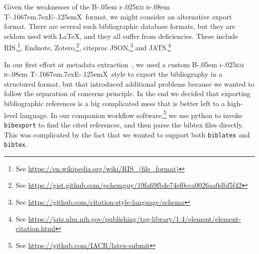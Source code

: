 \documentclass{article}
\newcommand{\BibTeX}{{\rmfamily B\kern-.05em%
   \textsc{i\kern-.025em b}\kern-.08em%
   T\kern-.1667em\lower.7ex\hbox{E}\kern-.125emX}}
\newcommand{\pkg}[1]{\texttt{#1}}
\begin{document}
\begin{description}
Given the weaknesses of the \BibTeX\ format, we might consider an
alternative export format.  There are several such bibliographic
database formats, but they are seldom used with \LaTeX, and they all
suffer from deficiencies.  These include
RIS,\footnote{See \url{https://en.wikipedia.org/wiki/RIS_(file_format)}},
Endnote,
Zotero,\footnote{See \url{https://gist.github.com/pchemguy/19fa69fb4e74ef0cca0026aa0dbf5f42}},
citeproc
JSON,\footnote{See \url{https://github.com/citation-style-language/schema}}
and
JATS.\footnote{See \url{https://jats.nlm.nih.gov/publishing/tag-library/1.4/element/element-citation.html}}

In our first effort at metadata extraction~\cite{tugboat}, we used a
custom \BibTeX\ style to export the bibliography in a structured
format, but that introduced additional problems because we wanted to
follow the separation of concerns principle.  In the end we decided
that exporting bibliographic references is a big complicated mess that
is better left to a high-level language.  In our companion workflow
software,\footnote{See \url{https://github.com/IACR/latex-submit}} we
use python to invoke \pkg{bibexport} to find the cited references, and
then parse the bibtex files directly. This was complicated by the fact
that we wanted to support both
\pkg{biblatex} and \pkg{bibtex}.


\end{description}
\end{document}
